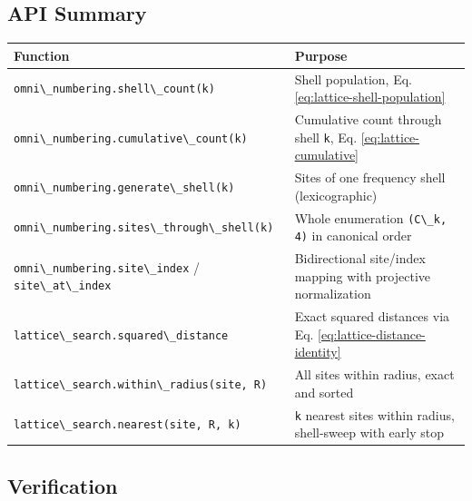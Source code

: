 \documentclass[
  10pt,
]{article}
\newcommand{\passthrough}[1]{#1}
\newcounter{none} %
\begin{document}
\subsection{API Summary}\label{api-summary}

{\def\LTcaptype{none} %
\begin{longtable}[]{@{}
  >{\raggedright\arraybackslash}p{}
  >{\raggedright\arraybackslash}p{}@{}}
\toprule\noalign{}
\begin{minipage}[b]{\linewidth}\raggedright
Function
\end{minipage} & \begin{minipage}[b]{\linewidth}\raggedright
Purpose
\end{minipage} \\
\midrule\noalign{}
\endhead
\bottomrule\noalign{}
\endlastfoot
\passthrough{\lstinline!omni\_numbering.shell\_count(k)!} & Shell
population, Eq. \eqref{eq:lattice-shell-population} \\
\passthrough{\lstinline!omni\_numbering.cumulative\_count(k)!} &
Cumulative count through shell \passthrough{\lstinline!k!}, Eq.
\eqref{eq:lattice-cumulative} \\
\passthrough{\lstinline!omni\_numbering.generate\_shell(k)!} & Sites of
one frequency shell (lexicographic) \\
\passthrough{\lstinline!omni\_numbering.sites\_through\_shell(k)!} &
Whole enumeration \passthrough{\lstinline!(C\_k, 4)!} in canonical
order \\
\passthrough{\lstinline!omni\_numbering.site\_index!} /
\passthrough{\lstinline!site\_at\_index!} & Bidirectional site/index
mapping with projective normalization \\
\passthrough{\lstinline!lattice\_search.squared\_distance!} & Exact
squared distances via Eq. \eqref{eq:lattice-distance-identity} \\
\passthrough{\lstinline!lattice\_search.within\_radius(site, R)!} & All
sites within radius, exact and sorted \\
\passthrough{\lstinline!lattice\_search.nearest(site, R, k)!} &
\passthrough{\lstinline!k!} nearest sites within radius, shell-sweep
with early stop \\
\end{longtable}
}

\subsection{Verification}\label{verification}
\end{document}
